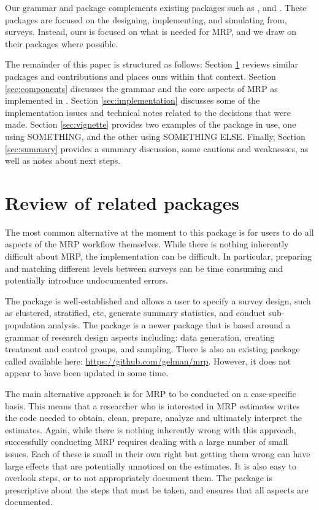 \documentclass[
]{jss}
\begin{document}
Our grammar and package complements existing packages such as
 \citep[\citet{lumleytwo},
\citet{lumleythree}]{lumleyone}, and 
\citep{citeDeclareDesign}. These packages are focused on the designing,
implementing, and simulating from, surveys. Instead, ours is focused on
what is needed for MRP, and we draw on their packages where possible.

The remainder of this paper is structured as follows: Section
\ref{sec:review} reviews similar packages and contributions and places
ours within that context. Section \ref{sec:components} discusses the
grammar and the core aspects of MRP as implemented in .
Section \ref{sec:implementation} discusses some of the implementation
issues and technical notes related to the decisions that were made.
Section \ref{sec:vignette} provides two examples of the package in use,
one using SOMETHING, and the other using SOMETHING ELSE. Finally,
Section \ref{sec:summary} provides a summary discussion, some cautions
and weaknesses, as well as notes about next steps.

\section{Review of related packages} \label{sec:review}

The most common alternative at the moment to this package is for users
to do all aspects of the MRP workflow themselves. While there is nothing
inherently difficult about MRP, the implementation can be difficult. In
particular, preparing and matching different levels between surveys can
be time consuming and potentially introduce undocumented errors.

The  package \citep[\citet{lumleytwo},
\citet{lumleythree}]{lumleyone} is well-established and allows a user to
specify a survey design, such as clustered, stratified, etc, generate
summary statistics, and conduct sub-population analysis. The
 package \citep{citeDeclareDesign} is a newer
package that is based around a grammar of research design aspects
including: data generation, creating treatment and control groups, and
sampling. There is also an existing package called 
available here: \url{https://github.com/gelman/mrp}. However, it does
not appear to have been updated in some time.

The main alternative approach is for MRP to be conducted on a
case-specific basis. This means that a researcher who is interested in
MRP estimates writes the code needed to obtain, clean, prepare, analyze
and ultimately interpret the estimates. Again, while there is nothing
inherently wrong with this approach, successfully conducting MRP
requires dealing with a large number of small issues. Each of these is
small in their own right but getting them wrong can have large effects
that are potentially unnoticed on the estimates. It is also easy to
overlook steps, or to not appropriately document them. The
 package is prescriptive about the steps that must be
taken, and ensures that all aspects are documented.
\end{document}
